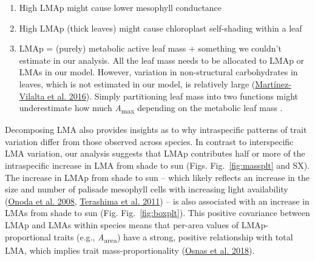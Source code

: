 \documentclass[
  12pt,
  a4paper,
,tablecaptionabove
]{scrartcl}
\providecommand{\tightlist}{%
  \setlength{\itemsep}{0pt}\setlength{\parskip}{0pt}}
\begin{document}
\begin{enumerate}
\def\labelenumi{\arabic{enumi}.}
\tightlist
\item
  High LMAp might cause lower mesophyll conductance
\item
  High LMAp (thick leaves) might cause chloroplast self-shading within a leaf
\item
  LMAp = (purely) metabolic active leaf mass + something we couldn't estimate in our analysis. All the leaf mass needs to be allocated to LMAp or LMAs in our model. However, variation in non-structural carbohydrates in leaves, which is not estimated in our model, is relatively large (\protect\hyperlink{ref-Martinez-Vilalta2016}{Martínez-Vilalta et al. 2016}). Simply partitioning leaf mass into two functions might underestimate how much \emph{A}\textsubscript{max} depending on the metabolic leaf mass .
\end{enumerate}

Decomposing LMA also provides insights as to why intraspecific patterns of trait variation differ from those observed across species.
In contrast to interspecific LMA variation, our analysis suggests that LMAp contributes half or more of the intraspecific increase in LMA from shade to sun (Figs. Fig.~\ref{fig:massplt} and SX).
The increase in LMAp from shade to sun -- which likely reflects an increase in the size and number of palisade mesophyll cells with increasing light availability (\protect\hyperlink{ref-Onoda2008}{Onoda et al. 2008}, \protect\hyperlink{ref-Terashima2011}{Terashima et al. 2011}) -- is also associated with an increase in LMAs from shade to sun (Fig. Fig.~\ref{fig:boxplt}).
This positive covariance between LMAp and LMAs within species means that per-area values of LMAp-proportional traits (e.g., \emph{A}\textsubscript{area}) have a strong, positive relationship with total LMA, which implies trait mass-proportionality (\protect\hyperlink{ref-Osnas2018}{Osnas et al. 2018}).
\end{document}
